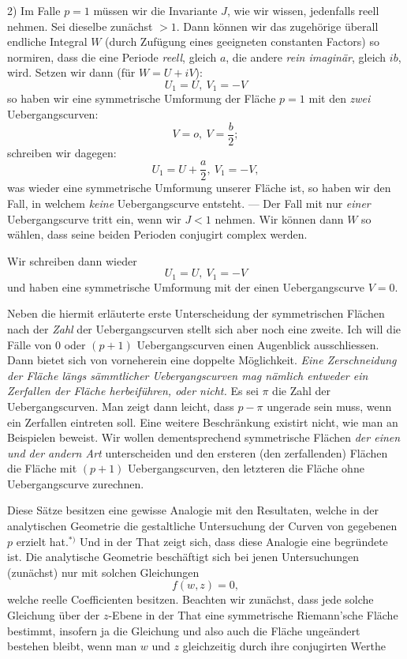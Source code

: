 \documentclass{article}
\begin{document}
2) Im Falle $p = 1$ müssen wir die Invariante $J$, wie wir wissen, jedenfalls reell nehmen. Sei dieselbe zunächst $> 1$. Dann können wir das zugehörige überall endliche Integral $W$ (durch Zufügung eines geeigneten constanten Factors) so normiren, dass die eine Periode \emph{reell}, gleich $a$, die andere \emph{rein imaginär}, gleich $ib$, wird. Setzen wir dann (für $W = U + iV$):
\[ U_{1} = U,\ V_{1} = - V \]
so haben wir eine symmetrische Umformung der Fläche $p = 1$ mit den \emph{zwei} Uebergangscurven:
\[ V = o,\ V = \frac{b}{2}; \]
schreiben wir dagegen:
\[ U_{1} = U + \frac{a}{2},\ V_{1} = - V, \]
was wieder eine symmetrische Umformung unserer Fläche ist, so haben wir den Fall, in welchem \emph{keine} Uebergangscurve entsteht. --- Der Fall mit nur \emph{einer} Uebergangscurve tritt ein, wenn wir $J < 1$ nehmen. Wir können dann $W$ so wählen, dass seine beiden Perioden conjugirt complex werden.

Wir schreiben dann wieder
\[ U_{1} = U,\ V_{1} = - V \]
und haben eine symmetrische Umformung mit der einen Uebergangscurve $V = 0$.

Neben die hiermit erläuterte erste Unterscheidung der symmetrischen Flächen nach der \emph{Zahl} der Uebergangscurven stellt sich aber noch eine zweite. Ich will die Fälle von $0$ oder $(p + 1)$ Uebergangscurven einen Augenblick ausschliessen. Dann bietet sich von vorneherein eine doppelte Möglichkeit. \emph{Eine Zerschneidung der Fläche längs sämmtlicher Uebergangscurven mag nämlich entweder ein Zerfallen der Fläche herbeiführen, oder nicht.} Es sei $\pi$ die Zahl der Uebergangscurven. Man zeigt dann leicht, dass $p - \pi$ ungerade sein muss, wenn ein Zerfallen eintreten soll. Eine weitere Beschränkung existirt nicht, wie man an Beispielen beweist. Wir wollen dementsprechend symmetrische Flächen \emph{der einen und der andern Art} unterscheiden und den ersteren (den zerfallenden) Flächen die Fläche mit $(p + 1)$ Uebergangscurven, den letzteren die Fläche ohne Uebergangscurve zurechnen.

Diese Sätze besitzen eine gewisse Analogie mit den Resultaten, welche in der analytischen Geometrie die gestaltliche Untersuchung der Curven von gegebenen $p$ erzielt hat.${}^{*)}$ Und in der That zeigt sich, dass diese Analogie eine begründete ist. Die analytische Geometrie beschäftigt sich bei jenen Untersuchungen (zunächst) nur mit solchen Gleichungen
\[ f(w, z) = 0, \]
welche reelle Coefficienten besitzen. Beachten wir zunächst, dass jede solche Gleichung über der $z$-Ebene in der That eine symmetrische Riemann'sche Fläche bestimmt, insofern ja die Gleichung und also auch die Fläche ungeändert bestehen bleibt, wenn man $w$ und $z$ gleichzeitig durch ihre conjugirten Werthe
\end{document}
